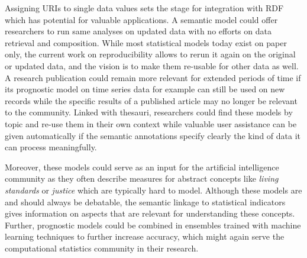 \documentclass{acm_proc_article-sp}
\begin{document}
Assigning URIs to single data values sets the stage for integration with RDF which has potential for valuable applications.
A semantic model could offer researchers to run same analyses on updated data with no efforts on data retrieval and composition.
While most statistical models today exist on paper only, the current work on reproducibility allows to rerun it again on the original or updated data, and the vision is to make them re-usable for other data as well.
A research publication could remain more relevant for extended periods of time if its prognostic model on time series data for example can still be used on new records while the specific results of a published article may no longer be relevant to the community.
Linked with thesauri, researchers could find these models by topic and re-use them in their own context while valuable user assistance can be given automatically if the semantic annotations specify clearly the kind of data it can process meaningfully.


Moreover, these models could serve as an input for the artificial intelligence community as they often describe measures for abstract concepts like \textit{living standards} or \textit{justice} which are typically hard to model.
Although these models are and should always be debatable, the semantic linkage to statistical indicators gives information on aspects that are relevant for understanding these concepts.
Further, prognostic models could be combined in ensembles trained with machine learning techniques to further increase accuracy, which might again serve the computational statistics community in their research.
\end{document}

